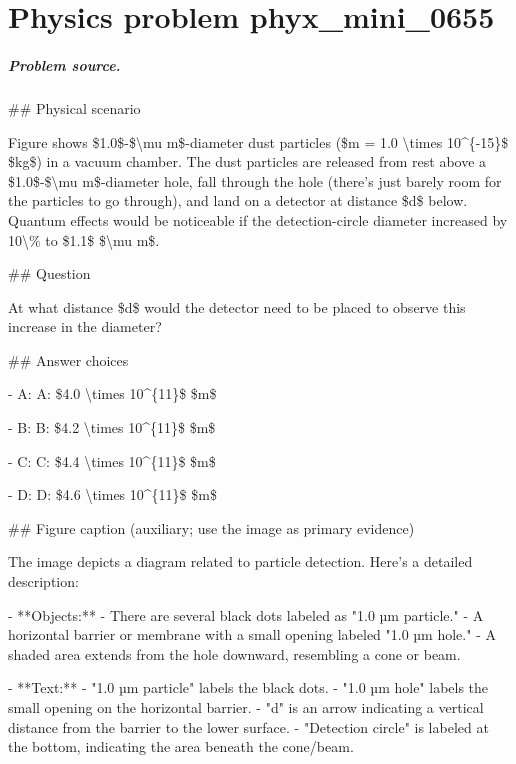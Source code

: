 
\chapter{Physics problem phyx\_mini\_0655}
\label{ch:PhyXMiniProblems_problem_phyx_mini_0655}

\paragraph{Problem source.}
\#\# Physical scenario

Figure shows \$1.0\$-\$\textbackslash{}mu m\$-diameter dust particles (\$m = 1.0 \textbackslash{}times 10\textasciicircum{}\{-15\}\$ \$kg\$) in a vacuum chamber. The dust particles are released from rest above a \$1.0\$-\$\textbackslash{}mu m\$-diameter hole, fall through the hole (there's just barely room for the particles to go through), and land on a detector at distance \$d\$ below. Quantum effects would be noticeable if the detection-circle diameter increased by 10\textbackslash{}\% to \$1.1\$ \$\textbackslash{}mu m\$.

\#\# Question

At what distance \$d\$ would the detector need to be placed to observe this increase in the diameter?

\#\# Answer choices

- A: A: \$4.0 \textbackslash{}times 10\textasciicircum{}\{11\}\$ \$m\$

- B: B: \$4.2 \textbackslash{}times 10\textasciicircum{}\{11\}\$ \$m\$

- C: C: \$4.4 \textbackslash{}times 10\textasciicircum{}\{11\}\$ \$m\$

- D: D: \$4.6 \textbackslash{}times 10\textasciicircum{}\{11\}\$ \$m\$

\#\# Figure caption (auxiliary; use the image as primary evidence)

The image depicts a diagram related to particle detection. Here's a detailed description:

- **Objects:**
  - There are several black dots labeled as "1.0 µm particle."
  - A horizontal barrier or membrane with a small opening labeled "1.0 µm hole."
  - A shaded area extends from the hole downward, resembling a cone or beam.

- **Text:**
  - "1.0 µm particle" labels the black dots.
  - "1.0 µm hole" labels the small opening on the horizontal barrier.
  - "d" is an arrow indicating a vertical distance from the barrier to the lower surface.
  - "Detection circle" is labeled at the bottom, indicating the area beneath the cone/beam.

